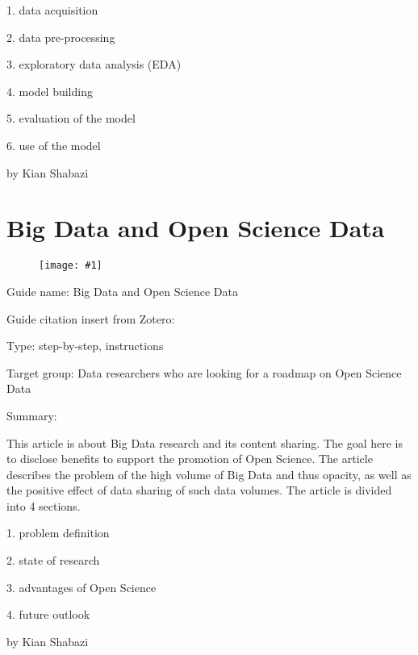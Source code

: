 \documentclass{article}
\newlength{\imgwidth}
\newcommand\scaledgraphics[2]{%
                
\settowidth{\imgwidth}{\texttt{[image: \#1]}}%
                
\setlength{\imgwidth}{\minof{\imgwidth}{#2\textwidth}}%
                
\texttt{[image: \#1]}%
                
}
\begin{document}
1. data acquisition


2. data pre-processing


3. exploratory data analysis (EDA)


4. model building


5. evaluation of the model


6. use of the model





by Kian Shabazi





\section{Big Data and Open Science Data}\label{H6205473}



\begin{center}
\begin{figure}
\scaledgraphics{25f071a6-9aec-4c08-bfd3-bfb548adfaee.jpg}{0.5}
\label{F77040021}
\end{figure}


\end{center}


 


Guide name: Big Data and Open Science Data


Guide citation insert from Zotero: \autocite{gutierrez_big_2015}


Type: step-by-step, instructions


Target group: Data researchers who are looking for a roadmap on Open Science Data


Summary: 


This article is about Big Data research and its content sharing. The goal here is to disclose benefits to support the promotion of Open Science. The article describes the problem of the high volume of Big Data and thus opacity, as well as the positive effect of data sharing of such data volumes. The article is divided into 4 sections.


1. problem definition


2. state of research


3. advantages of Open Science


4. future outlook





by Kian Shabazi
\end{document}
